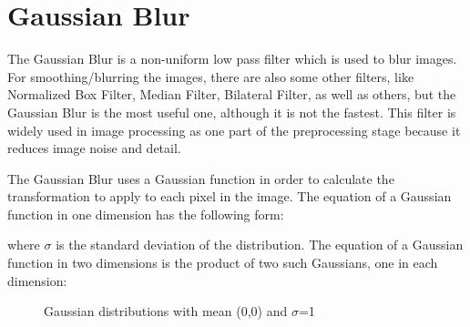%
\section{Gaussian Blur}\label{sec:Gaussian Blur}

The Gaussian Blur is a non-uniform low pass filter which is used to blur images. For smoothing/blurring the images, there are also some other filters, like Normalized Box Filter, Median Filter, Bilateral Filter, as well as others, but the Gaussian Blur is the most useful one, although it is not the fastest. This filter is widely used in image processing as one part of the preprocessing stage because it reduces image noise and detail.

The Gaussian Blur uses a Gaussian function in order to calculate the transformation to apply to each pixel in the image. The equation of a Gaussian function in one dimension has the following form\cite{GaussianBlur}: 

 \begin{center}
\end{center}

where $ \sigma $ is the standard deviation of the distribution. The equation of a Gaussian function in two dimensions is the product of two such Gaussians, one in each dimension\cite{GaussianBlur}: 

 \begin{center}
\end{center}



\begin{figure}[H]
  \centering
  \hfill
  \caption{Gaussian distributions with mean (0,0) and $\sigma$=1\cite{GaussianBlur}}
\end{figure} 



